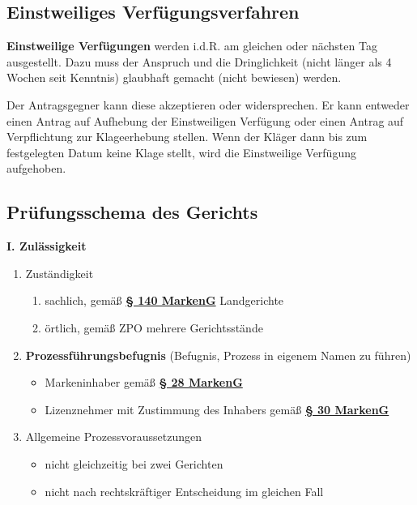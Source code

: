 \documentclass[12pt,A4]{extarticle}
\newcommand{\markenG}[2][]{\textbf{\textcolor{markenGesetzLink}{\href{https://www.gesetze-im-internet.de/markeng/__#2.html}{§ #2 \ifthenelse{\equal{#1}{}}{}{#1 }MarkenG}}}}
\begin{document}
\subsection{Einstweiliges Verfügungsverfahren}
\textbf{Einstweilige Verfügungen} werden i.d.R. am gleichen oder nächsten Tag ausgestellt. Dazu muss der Anspruch und die Dringlichkeit (nicht länger als 4 Wochen seit Kenntnis) glaubhaft gemacht (nicht bewiesen) werden.\par
Der Antragsgegner kann diese akzeptieren oder widersprechen. Er kann entweder einen Antrag auf Aufhebung der Einstweiligen Verfügung oder einen Antrag auf Verpflichtung zur Klageerhebung stellen. Wenn der Kläger dann bis zum festgelegten Datum keine Klage stellt, wird die Einstweilige Verfügung aufgehoben.

\subsection{Prüfungsschema des Gerichts}
\textbf{I. Zulässigkeit}
\begin{enumerate}
  \item{Zuständigkeit
              \begin{enumerate}
                \item{sachlich, gemäß \markenG{140} Landgerichte}
                \item{örtlich, gemäß ZPO mehrere Gerichtsstände}
              \end{enumerate}
        }
  \item{\textbf{Prozessführungsbefugnis} (Befugnis, Prozess in eigenem Namen zu führen)
              \begin{itemize}
                \item{Markeninhaber gemäß \markenG{28}}
                \item{Lizenznehmer mit Zustimmung des Inhabers gemäß \markenG[Abs. 3]{30}}
              \end{itemize}
        }
  \item{Allgemeine Prozessvoraussetzungen
              \begin{itemize}
                \item{nicht gleichzeitig bei zwei Gerichten}
                \item{nicht nach rechtskräftiger Entscheidung im gleichen Fall}
              \end{itemize}
        }
\end{enumerate}
\end{document}
